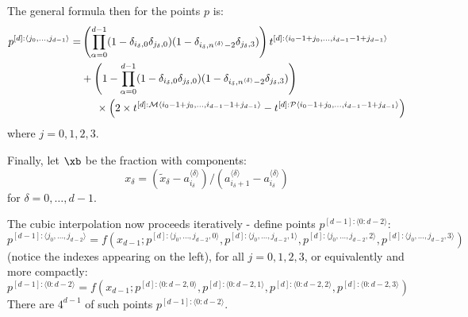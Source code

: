 \documentclass[11pt]{article}
\begin{document}
The general formula then for the points $p$ is:
\begin{equation}
\begin{split}
p^{[d]:\langle j_0, \dots, j_{d-1} \rangle} 
=& 
\left ( \prod_{\alpha = 0}^{d-1} (1 - \delta_{i_\delta,0} \delta_{j_\delta,0} ) (1 - \delta_{i_\delta,n^{\langle \delta \rangle}-2} \delta_{j_\delta,3} ) \right )
t^{[d]:\langle i_0-1+j_0, \dots, i_{d-1}-1+j_{d-1} \rangle} \\
&+
\left ( 1 - \prod_{\alpha = 0}^{d-1} (1 - \delta_{i_\delta,0} \delta_{j_\delta,0} ) (1 - \delta_{i_\delta,n^{\langle \delta \rangle}-2} \delta_{j_\delta,3} ) \right ) \\
&\hspace{5mm} \times \left (
2 \times t^{[d]:{\cal M}\langle i_0-1+j_0, \dots, i_{d-1}-1+j_{d-1} \rangle} - t^{[d]:{\cal P}\langle i_0-1+j_0, \dots, i_{d-1}-1+j_{d-1} \rangle}
\right )
\end{split}
\label{eq:general}
\end{equation}
where $j=0,1,2,3$.

Finally, let $\xb$ be the fraction with components:
\begin{equation}
x_\delta = (\tilde{x}_\delta - a_{i_\delta}^{\langle \delta \rangle}) / (a_{i_\delta+1}^{\langle \delta \rangle} - a_{i_\delta}^{\langle \delta \rangle})
\end{equation}
for $\delta=0,\dots,d-1$.

The cubic interpolation now proceeds iteratively - define points $p^{[d-1]: \langle 0: d-2 \rangle}$:
\begin{equation}
p^{[d-1]: \langle j_0,\dots,j_{d-2} \rangle} = f \left ( 
x_{d-1} ; 
p^{[d]: \langle j_0,\dots,j_{d-2},0 \rangle},
p^{[d]: \langle j_0,\dots,j_{d-2},1 \rangle},
p^{[d]: \langle j_0,\dots,j_{d-2},2 \rangle},
p^{[d]: \langle j_0,\dots,j_{d-2},3 \rangle}
\right )
\end{equation}
(notice the indexes appearing on the left), for all $j=0,1,2,3$, or equivalently and more compactly:
\begin{equation}
p^{[d-1]: \langle 0:d-2 \rangle} = f \left ( 
x_{d-1} ; 
p^{[d]: \langle 0:d-2,0 \rangle},
p^{[d]: \langle 0:d-2,1 \rangle},
p^{[d]: \langle 0:d-2,2 \rangle},
p^{[d]: \langle 0:d-2,3 \rangle}
\right )
\label{eq:iterate1}
\end{equation}
There are $4^{d-1}$ of such points $p^{[d-1]:\langle 0:d-2 \rangle}$.
\end{document}
